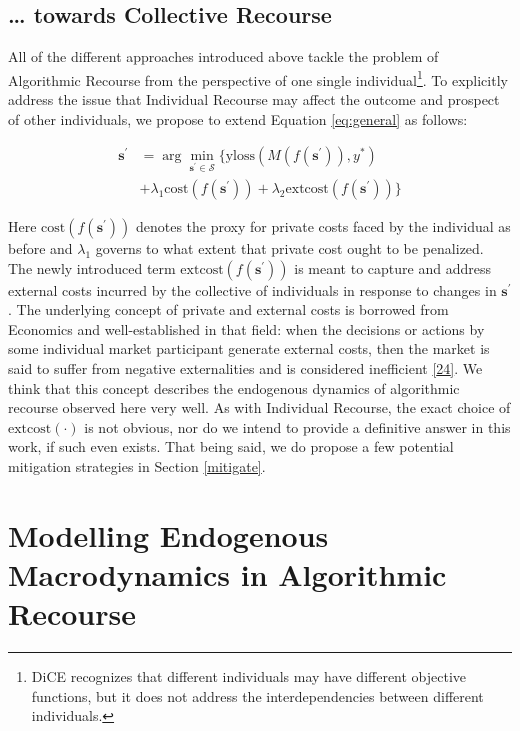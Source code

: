 \documentclass[conference,final,]{IEEEtran}
\theoremstyle{definition}
\theoremstyle{definition}
\theoremstyle{definition}
\theoremstyle{definition}
\theoremstyle{remark}
\begin{document}
\hypertarget{method-collective}{%
\subsection{\ldots{} towards Collective Recourse}\label{method-collective}}

All of the different approaches introduced above tackle the problem of Algorithmic Recourse from the perspective of one single individual\footnote{DiCE recognizes that different individuals may have different objective functions, but it does not address the interdependencies between different individuals.}. To explicitly address the issue that Individual Recourse may affect the outcome and prospect of other individuals, we propose to extend Equation \eqref{eq:general} as follows:

\begin{equation}
\begin{aligned}
\mathbf{s}^\prime &= \arg \min_{\mathbf{s}^\prime \in \mathcal{S}} \{ {\text{yloss}(M(f(\mathbf{s}^\prime)),y^*)} \\ &+ \lambda_1 {\text{cost}(f(\mathbf{s}^\prime))} + \lambda_2 {\text{extcost}(f(\mathbf{s}^\prime))} \}  \label{eq:collective}
\end{aligned} 
\end{equation}

Here \(\text{cost}(f(\mathbf{s}^\prime))\) denotes the proxy for private costs faced by the individual as before and \(\lambda_1\) governs to what extent that private cost ought to be penalized. The newly introduced term \(\text{extcost}(f(\mathbf{s}^\prime))\) is meant to capture and address external costs incurred by the collective of individuals in response to changes in \(\mathbf{s}^\prime\). The underlying concept of private and external costs is borrowed from Economics and well-established in that field: when the decisions or actions by some individual market participant generate external costs, then the market is said to suffer from negative externalities and is considered inefficient \protect\hyperlink{ref-pindyck2014microeconomics}{{[}24{]}}. We think that this concept describes the endogenous dynamics of algorithmic recourse observed here very well. As with Individual Recourse, the exact choice of \(\text{extcost}(\cdot)\) is not obvious, nor do we intend to provide a definitive answer in this work, if such even exists. That being said, we do propose a few potential mitigation strategies in Section \ref{mitigate}.

\hypertarget{method-2}{%
\section{Modelling Endogenous Macrodynamics in Algorithmic Recourse}\label{method-2}}
\end{document}
